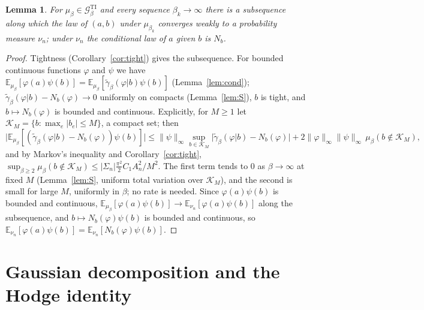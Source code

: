 \documentclass[11pt,a4paper]{article}
\theoremstyle{plain}
\newtheorem{lemma}[theorem]{Lemma}
\theoremstyle{definition}
\theoremstyle{remark}
\numberwithin{equation}{section}
\newcommand{\E}{\mathbb{E}}
\newcommand{\cG}{\mathcal{G}}
\begin{document}
\begin{lemma}\label{lem:DLRlim}
For $\mu_\beta\in\cG^{\mathrm{TI}}_\beta$ and every sequence $\beta_k\to\infty$ there is a subsequence along which the law of $(a,b)$ under
$\mu_{\beta_k}$ converges weakly to a probability measure $\nu_n$; under $\nu_n$ the conditional law of $a$ given $b$ is $N_b$.
\end{lemma}
\begin{proof}
Tightness (Corollary~\ref{cor:tight}) gives the subsequence. For bounded continuous functions $\varphi$ and $\psi$ we have
$\E_{\mu_\beta}[\varphi(a)\psi(b)]=\E_{\mu_\beta}[\tilde\gamma_\beta(\varphi|b)\psi(b)]$ (Lemma~\ref{lem:cond});
$\tilde\gamma_\beta(\varphi|b)-N_b(\varphi)\to0$ uniformly on compacts (Lemma~\ref{lem:S}), $b$ is tight, and $b\mapsto N_b(\varphi)$ is bounded and continuous.
Explicitly, for $M\ge1$ let $\mathcal K_M=\{b:\max_e|b_e|\le M\}$, a compact set; then
\[
\bigl|\E_{\mu_\beta}[(\tilde\gamma_\beta(\varphi|b)-N_b(\varphi))\psi(b)]\bigr|
\le\|\psi\|_\infty\sup_{b\in\mathcal K_M}\bigl|\tilde\gamma_\beta(\varphi|b)-N_b(\varphi)\bigr|
+2\|\varphi\|_\infty\|\psi\|_\infty\,\mu_\beta(b\notin\mathcal K_M),
\]
and by Markov's inequality and Corollary~\ref{cor:tight}, $\sup_{\beta\ge2}\mu_\beta(b\notin\mathcal K_M)\le|\Sigma_n|\tfrac{\pi^2}{2}C_1A_n^2/M^2$.
The first term tends to $0$ as $\beta\to\infty$ at fixed $M$ (Lemma~\ref{lem:S}, uniform total variation over $\mathcal K_M$), and the second is small for large $M$, uniformly in $\beta$; no rate is needed.
Since $\varphi(a)\psi(b)$ is bounded and continuous, $\E_{\mu_\beta}[\varphi(a)\psi(b)]\to\E_{\nu_n}[\varphi(a)\psi(b)]$ along the subsequence, and $b\mapsto N_b(\varphi)\psi(b)$ is bounded and continuous, so
$\E_{\nu_n}[\varphi(a)\psi(b)]=\E_{\nu_n}[N_b(\varphi)\psi(b)]$.
\end{proof}

\section{Gaussian decomposition and the Hodge identity}\label{sec:H}
\end{document}
